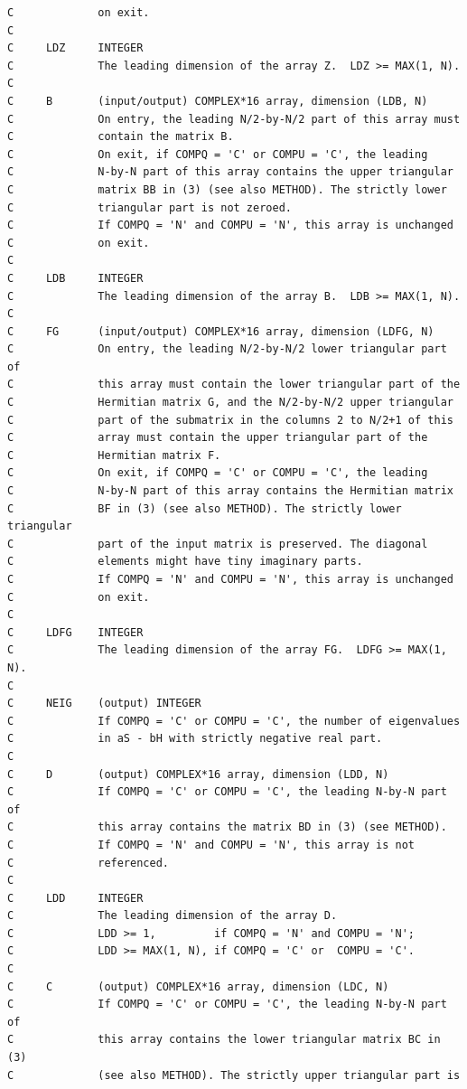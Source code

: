 \documentclass[a4paper,10pt]{article}
\begin{document}
\begin{verbatim}
C             on exit.
C
C     LDZ     INTEGER
C             The leading dimension of the array Z.  LDZ >= MAX(1, N).
C
C     B       (input/output) COMPLEX*16 array, dimension (LDB, N)
C             On entry, the leading N/2-by-N/2 part of this array must
C             contain the matrix B.
C             On exit, if COMPQ = 'C' or COMPU = 'C', the leading
C             N-by-N part of this array contains the upper triangular
C             matrix BB in (3) (see also METHOD). The strictly lower
C             triangular part is not zeroed. 
C             If COMPQ = 'N' and COMPU = 'N', this array is unchanged
C             on exit.
C
C     LDB     INTEGER
C             The leading dimension of the array B.  LDB >= MAX(1, N).
C
C     FG      (input/output) COMPLEX*16 array, dimension (LDFG, N)
C             On entry, the leading N/2-by-N/2 lower triangular part of
C             this array must contain the lower triangular part of the
C             Hermitian matrix G, and the N/2-by-N/2 upper triangular
C             part of the submatrix in the columns 2 to N/2+1 of this
C             array must contain the upper triangular part of the
C             Hermitian matrix F.
C             On exit, if COMPQ = 'C' or COMPU = 'C', the leading
C             N-by-N part of this array contains the Hermitian matrix
C             BF in (3) (see also METHOD). The strictly lower triangular
C             part of the input matrix is preserved. The diagonal
C             elements might have tiny imaginary parts.
C             If COMPQ = 'N' and COMPU = 'N', this array is unchanged
C             on exit.
C
C     LDFG    INTEGER
C             The leading dimension of the array FG.  LDFG >= MAX(1, N).
C
C     NEIG    (output) INTEGER
C             If COMPQ = 'C' or COMPU = 'C', the number of eigenvalues
C             in aS - bH with strictly negative real part.
C
C     D       (output) COMPLEX*16 array, dimension (LDD, N)
C             If COMPQ = 'C' or COMPU = 'C', the leading N-by-N part of
C             this array contains the matrix BD in (3) (see METHOD).
C             If COMPQ = 'N' and COMPU = 'N', this array is not
C             referenced.
C
C     LDD     INTEGER
C             The leading dimension of the array D.
C             LDD >= 1,         if COMPQ = 'N' and COMPU = 'N';
C             LDD >= MAX(1, N), if COMPQ = 'C' or  COMPU = 'C'.
C
C     C       (output) COMPLEX*16 array, dimension (LDC, N)
C             If COMPQ = 'C' or COMPU = 'C', the leading N-by-N part of
C             this array contains the lower triangular matrix BC in (3)
C             (see also METHOD). The strictly upper triangular part is

\end{verbatim}
\end{document}
